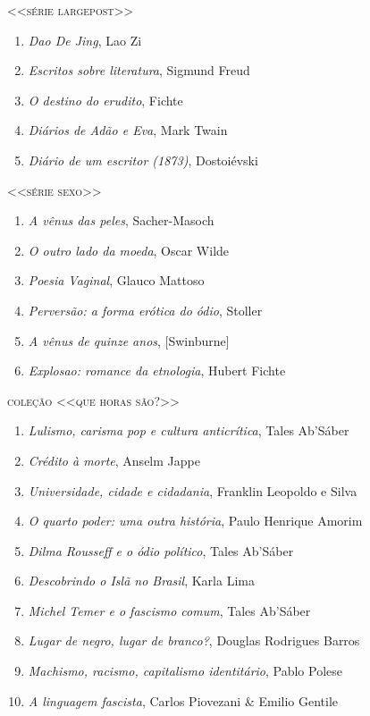 {\large\textsc{<<série largepost>>}}

\begin{enumerate}
\setlength\parskip{4.2pt}
\setlength\itemsep{-1.4mm}
\item \textit{Dao De Jing}, Lao Zi
\item \textit{Escritos sobre literatura}, Sigmund Freud
\item \textit{O destino do erudito}, Fichte
\item \textit{Diários de Adão e Eva}, Mark Twain
\item \textit{Diário de um escritor (1873)}, Dostoiévski
\end{enumerate}


\medskip

{\large\textsc{<<série sexo>>}}

\begin{enumerate}
\setlength\parskip{4.2pt}
\setlength\itemsep{-1.4mm}

\item \textit{A vênus das peles}, Sacher{}-Masoch
\item \textit{O outro lado da moeda}, Oscar Wilde
\item \textit{Poesia Vaginal}, Glauco Mattoso 
\item \textit{Perversão: a forma erótica do ódio}, Stoller
\item \textit{A vênus de quinze anos}, [Swinburne]
\item \textit{Explosao: romance da etnologia}, Hubert Fichte

\end{enumerate}

\medskip
{\large\textsc{coleção <<que horas são?>>}}

\begin{enumerate}
\setlength\parskip{4.2pt}
\setlength\itemsep{-1.4mm}
\item \textit{Lulismo, carisma pop e cultura anticrítica}, Tales Ab'Sáber
\item \textit{Crédito à morte}, Anselm Jappe
\item \textit{Universidade, cidade e cidadania}, Franklin Leopoldo e Silva
\item \textit{O quarto poder: uma outra história}, Paulo Henrique Amorim
\item \textit{Dilma Rousseff e o ódio político}, Tales Ab'Sáber
\item \textit{Descobrindo o Islã no Brasil}, Karla Lima
\item \textit{Michel Temer e o fascismo comum}, Tales Ab'Sáber
\item \textit{Lugar de negro, lugar de branco?}, Douglas Rodrigues Barros
\item \textit{Machismo, racismo, capitalismo identitário}, Pablo Polese
\item \textit{A linguagem fascista}, Carlos Piovezani \& Emilio Gentile
\end{enumerate}

